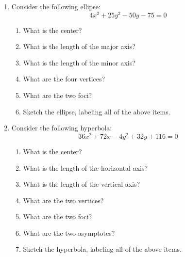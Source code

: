 \documentclass[letterpaper,12pt,fleqn]{article}
\begin{document}
\begin{enumerate}
\item Consider the following ellipse:
  \[4x^2+25y^2-50y-75=0\]
  \begin{enumerate}
  \item What is the center?
  \item What is the length of the major axis?
  \item What is the length of the minor axis?
  \item What are the four vertices?
  \item What are the two foci?
  \item Sketch the ellipse, labeling all of the above items.
  \end{enumerate}
\newpage
\item Consider the following hyperbola:
  \[36x^2+72x-4y^2+32y+116=0\]
  \begin{enumerate}
  \item What is the center?
  \item What is the length of the horizontal axis?
  \item What is the length of the vertical axis?
  \item What are the two vertices?
  \item What are the two foci?
  \item What are the two asymptotes?
  \item Sketch the hyperbola, labeling all of the above items.
  \end{enumerate}
\end{enumerate}
\end{document}
